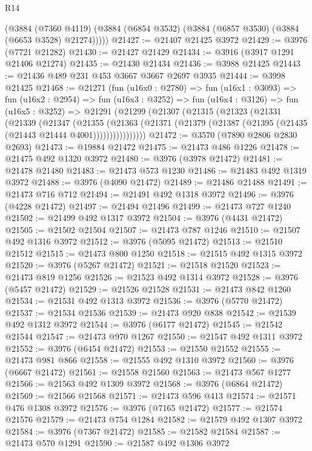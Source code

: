 \begin{lexlean}{R14}
\begin{coremodule}
      (@3884
        (@7360 @4119)
        (@3884 (@6854 @3532) (@3884 (@6857 @3530) (@3884 (@6653 @3528) @21274)))))
@21427 := @21407 @21425 @3972
@21429 := @3976 (@7721 @21282)
@21430 := @21427 @21429
@21434 := @3916 (@3917 @1291 @21406 @21274)
@21435 := @21430 @21434
@21436 := @3988 @21425
@21443 := @21436 @489 @231 @453 @3667 @3667 @2697 @3935
@21444 := @3998 @21425
@21468 := @21271
    (fun (u16x0 : @2780) =>
    fun (u16x1 : @3093) =>
    fun (u16x2 : @2954) =>
    fun (u16x3 : @3252) =>
    fun (u16x4 : @3126) =>
    fun (u16x5 : @3252) =>
    @21291
      (@21299
        (@21307
          (@21315
            (@21323
              (@21331
                (@21339
                  (@21347
                    (@21355
                      (@21363
                        (@21371 (@21379 (@21387 (@21395 (@21435 (@21443 @21444 @4001))))))))))))))))
@21472 := @3570 (@7890 @2806 @2830 @2693)
@21473 := @19884 @21472
@21475 := @21473 @486 @1226
@21478 := @21475 @492 @1320 @3972
@21480 := @3976 (@3978 @21472)
@21481 := @21478 @21480
@21483 := @21473 @573 @1230
@21486 := @21483 @492 @1319 @3972
@21488 := @3976 (@4090 @21472)
@21489 := @21486 @21488
@21491 := @21473 @716 @712
@21494 := @21491 @492 @1318 @3972
@21496 := @3976 (@4228 @21472)
@21497 := @21494 @21496
@21499 := @21473 @727 @1240
@21502 := @21499 @492 @1317 @3972
@21504 := @3976 (@4431 @21472)
@21505 := @21502 @21504
@21507 := @21473 @787 @1246
@21510 := @21507 @492 @1316 @3972
@21512 := @3976 (@5095 @21472)
@21513 := @21510 @21512
@21515 := @21473 @800 @1250
@21518 := @21515 @492 @1315 @3972
@21520 := @3976 (@5267 @21472)
@21521 := @21518 @21520
@21523 := @21473 @819 @1256
@21526 := @21523 @492 @1314 @3972
@21528 := @3976 (@5457 @21472)
@21529 := @21526 @21528
@21531 := @21473 @842 @1260
@21534 := @21531 @492 @1313 @3972
@21536 := @3976 (@5770 @21472)
@21537 := @21534 @21536
@21539 := @21473 @920 @838
@21542 := @21539 @492 @1312 @3972
@21544 := @3976 (@6177 @21472)
@21545 := @21542 @21544
@21547 := @21473 @970 @1267
@21550 := @21547 @492 @1311 @3972
@21552 := @3976 (@6454 @21472)
@21553 := @21550 @21552
@21555 := @21473 @981 @866
@21558 := @21555 @492 @1310 @3972
@21560 := @3976 (@6667 @21472)
@21561 := @21558 @21560
@21563 := @21473 @567 @1277
@21566 := @21563 @492 @1309 @3972
@21568 := @3976 (@6864 @21472)
@21569 := @21566 @21568
@21571 := @21473 @596 @413
@21574 := @21571 @476 @1308 @3972
@21576 := @3976 (@7165 @21472)
@21577 := @21574 @21576
@21579 := @21473 @754 @1284
@21582 := @21579 @492 @1307 @3972
@21584 := @3976 (@7367 @21472)
@21585 := @21582 @21584
@21587 := @21473 @570 @1291
@21590 := @21587 @492 @1306 @3972

\end{coremodule}
\end{lexlean}

